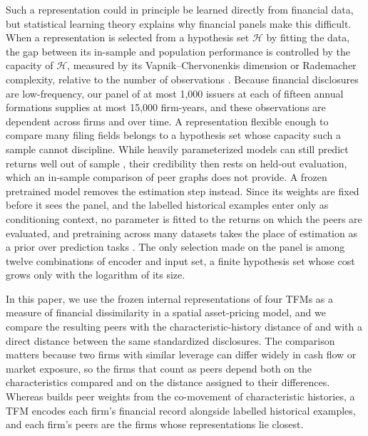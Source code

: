 Such a representation could in principle be learned directly from
financial data, but statistical learning theory explains why financial
panels make this difficult. When a representation is selected from a
hypothesis set $\mathcal{H}$ by fitting the data, the gap between its
in-sample and population performance is controlled by the capacity of
$\mathcal{H}$, measured by its Vapnik--Chervonenkis dimension or Rademacher
complexity, relative to the number of observations
\citep{shalevshwartz2014}. Because financial
disclosures are low-frequency, our panel of at most 1,000 issuers at each
of fifteen annual formations supplies at most 15,000 firm-years, and
these observations are
dependent across firms and over time. A representation flexible enough to
compare many filing fields belongs to a hypothesis set whose capacity such
a sample cannot discipline. While heavily parameterized models can still
predict returns well out of sample \citep{kelly2024virtue}, their
credibility then rests on held-out evaluation, which an in-sample
comparison of peer graphs does not provide. A frozen pretrained model
removes the estimation step instead. Since its weights are fixed before it
sees the panel, and the labelled historical examples enter only as
conditioning context, no parameter is fitted to the returns on which the
peers are evaluated, and pretraining across many datasets takes the place
of estimation as a prior over prediction tasks
\citep{muller2022,nagler2023}. The only selection made on the panel is
among twelve combinations of encoder and input set, a finite hypothesis set
whose cost grows only with the logarithm of its size.

In this paper, we use the frozen internal representations of four TFMs as a
measure of financial dissimilarity in a spatial asset-pricing model, and
we compare the resulting peers with the characteristic-history distance of
\citet{fernandez2011} and with a direct distance between the same
standardized disclosures. The comparison matters because two firms with
similar leverage can differ widely in cash flow or market exposure, so the
firms that count as peers depend both on the characteristics compared and
on the distance assigned to their differences. Whereas
\citet{fernandez2011} builds peer weights from the co-movement of
characteristic histories, a TFM encodes each firm's financial record
alongside labelled historical examples, and each firm's peers are the firms
whose representations lie closest.

